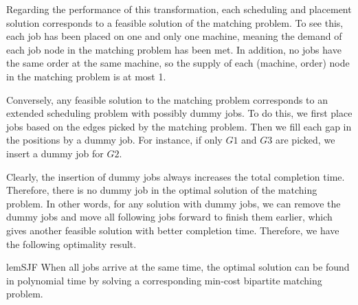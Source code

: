 Regarding the performance of this transformation, each scheduling and placement solution corresponds to a feasible solution of the matching problem. To see this, each job has been placed on one and only one machine, meaning the demand of each job node in the matching problem has been met. In addition, no jobs have the same order at the same machine, so the supply of each (machine, order) node in the matching problem is at most 1. 

Conversely, any feasible solution to the matching problem corresponds to an extended scheduling problem with possibly dummy jobs. 
To do this, we first place jobs based on the edges picked by the matching problem. Then we fill each gap in the positions by a dummy job. For instance, if only $G1$ and $G3$ are picked, we insert a dummy job for $G2$. 

Clearly, the insertion of dummy jobs always increases the total completion time. Therefore, there is no dummy job in the optimal solution of the matching problem. In other words, for any solution with dummy jobs, we can remove the dummy jobs and move all following jobs forward to finish them earlier, which gives another feasible solution with better completion time. 
Therefore, we have the following optimality result.

\begin{restatable}[]{lem}{SJF} When all jobs arrive at the same time, the optimal solution can be found in polynomial time by solving a corresponding min-cost bipartite matching problem. \end{restatable}



